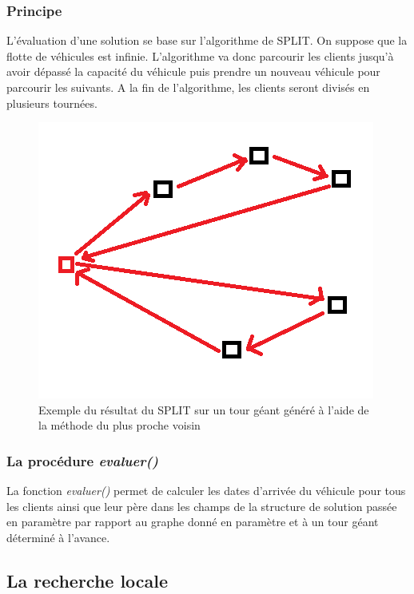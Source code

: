 \documentclass[12pt]{article}
\begin{document}
	 \subsubsection{Principe}
	 L'évaluation d'une solution se base sur l'algorithme de SPLIT. On suppose que la flotte de véhicules est infinie. L'algorithme va donc parcourir les clients jusqu'à avoir dépassé la capacité du véhicule puis prendre un nouveau véhicule pour parcourir les suivants. A la fin de l'algorithme, les clients seront divisés en plusieurs tournées.
    \begin{figure}[!h]
	    \centering
	    \includegraphics[scale = 1]{split.png}
	    \caption{Exemple du résultat du SPLIT sur un tour géant généré à l'aide de la méthode du plus proche voisin}
	    \label{fig5}
	\end{figure}\par
	 
	 \subsubsection{La procédure \emph{evaluer()}}\hypertarget{evaluer}{}
	 La fonction \emph{evaluer()} permet de calculer les dates d'arrivée du véhicule pour tous les clients ainsi que leur père dans les champs de la structure de solution passée en paramètre par rapport au graphe donné en paramètre et à un tour géant déterminé à l’avance.\\\par
	 
	\subsection{La recherche locale}
\end{document}
